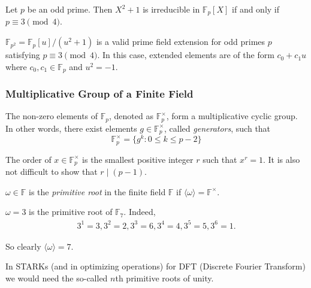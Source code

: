 \documentclass[../lecture-notes.tex]{subfiles}
\begin{document}
\begin{proposition}
    Let $p$ be an odd prime. Then $X^2+1$ is irreducible in $\mathbb{F}_p[X]$ if and only if $p \equiv 3 \pmod{4}$.
\end{proposition}

\begin{corollary}
    $\mathbb{F}_{p^2} = \mathbb{F}_p[u]/(u^2+1)$ is a valid prime field extension for odd primes $p$ satisfying $p \equiv 3 \pmod{4}$. In this case, extended elements are of the form $c_0+c_1u$ where $c_0,c_1 \in \mathbb{F}_p$ and $u^2=-1$.
\end{corollary}

\subsubsection{Multiplicative Group of a Finite Field}

The non-zero elements of $\mathbb{F}_p$, denoted as $\mathbb{F}_p^{\times}$, form a multiplicative cyclic group. In other words, there exist elements $g \in \mathbb{F}_p^{\times}$, called \textit{generators}, such that
\begin{equation*}
    \mathbb{F}_p^{\times} = \{g^k: 0 \leq k \leq p-2\}
\end{equation*}

The order of $x \in \mathbb{F}_p^{\times}$ is the smallest positive integer $r$ such that $x^r=1$. It is also not difficult to show that $r \mid (p-1)$.

\begin{definition}
    $\omega \in \mathbb{F}$ is the \textit{primitive root} in the finite field $\mathbb{F}$ if $\langle\omega\rangle = \mathbb{F}^{\times}$.
\end{definition}

\begin{example}
    $\omega=3$ is the primitive root of $\mathbb{F}_7$. Indeed,
    \begin{equation*}
        \begin{aligned}
            3^1=3, 3^2=2, 3^3=6, 3^4=4, 3^5=5, 3^6=1.
        \end{aligned}
    \end{equation*}

    So clearly $\langle \omega \rangle = 7$.
\end{example}

In STARKs (and in optimizing operations) for DFT (Discrete Fourier Transform) we would need the so-called $n$th primitive roots of unity.
\end{document}
